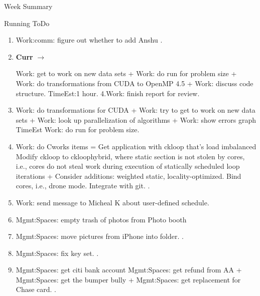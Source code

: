 \begin{columns}
\begin{column}{0.5\linewidth}
\begin{block}{Week Summary}
    \end{block}


      \begin{block}{Running ToDo} %
        \begin{enumerate}
            
             . 

        \item \tiny Work:comm: figure out whether to add Anshu .
        \item \tiny \textbf{Curr} $\rightarrow$ 

Work: get to work on new data sets + Work: do run for problem size +
Work: do transformations from CUDA to OpenMP 4.5 + Work: discuss code
structure. TimeEst:1 hour. 
4.Work: finish report for review.


        \item \tiny Work: do transformations for CUDA + Work: try to
          get to work on new data sets + Work: look up parallelization
          of algorithms + Work: show errors  graph TimeEst 
          Work: do run for problem size.  

        \item \tiny Work: do Cworks items = Get application with
          ckloop that’s load imbalanced Modify ckloop to ckloophybrid, where
          static section is not stolen by cores, i.e., cores do not steal
          work during execution of statically scheduled loop iterations +
          Consider additions: weighted static, locality-optimized. Bind
          cores, i.e., drone mode. Integrate with git.  
           .
 
        \item \tiny Work: send message to Micheal K about user-defined
          schedule. 

        \item \tiny Mgmt:Spaces: empty trash of photos from Photo booth 

        \item \tiny Mgmt:Spaces: move pictures from iPhone into folder. . 

        \item \tiny Mgmt:Spaces: fix key set. . 

        \item \tiny Mgmt:Spaces: get citi bank account
          Mgmt:Spaces: get refund from AA  + Mgmt:Spaces: get the
          bumper bully +  Mgmt:Spaces: get replacement for Chase card. .


\end{enumerate}
\end{block}
\end{column}
\end{columns}

